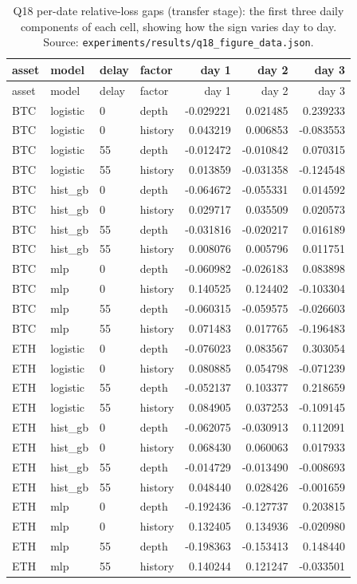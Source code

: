 \begin{longtable}{llllrrr}
\caption{Q18 per-date relative-loss gaps (transfer stage): the first three daily components of
each cell, showing how the sign varies day to day. Source:
\texttt{experiments/results/q18\_figure\_data.json}.}
\label{tab:q18daily}\\
\toprule
asset & model & delay & factor & day 1 & day 2 & day 3 \\
\midrule
\endfirsthead
\toprule
asset & model & delay & factor & day 1 & day 2 & day 3 \\
\midrule
\endhead
\bottomrule
\endfoot
BTC & logistic & 0 & depth & -0.029221 & 0.021485 & 0.239233 \\
BTC & logistic & 0 & history & 0.043219 & 0.006853 & -0.083553 \\
BTC & logistic & 55 & depth & -0.012472 & -0.010842 & 0.070315 \\
BTC & logistic & 55 & history & 0.013859 & -0.031358 & -0.124548 \\
BTC & hist\_gb & 0 & depth & -0.064672 & -0.055331 & 0.014592 \\
BTC & hist\_gb & 0 & history & 0.029717 & 0.035509 & 0.020573 \\
BTC & hist\_gb & 55 & depth & -0.031816 & -0.020217 & 0.016189 \\
BTC & hist\_gb & 55 & history & 0.008076 & 0.005796 & 0.011751 \\
BTC & mlp & 0 & depth & -0.060982 & -0.026183 & 0.083898 \\
BTC & mlp & 0 & history & 0.140525 & 0.124402 & -0.103304 \\
BTC & mlp & 55 & depth & -0.060315 & -0.059575 & -0.026603 \\
BTC & mlp & 55 & history & 0.071483 & 0.017765 & -0.196483 \\
ETH & logistic & 0 & depth & -0.076023 & 0.083567 & 0.303054 \\
ETH & logistic & 0 & history & 0.080885 & 0.054798 & -0.071239 \\
ETH & logistic & 55 & depth & -0.052137 & 0.103377 & 0.218659 \\
ETH & logistic & 55 & history & 0.084905 & 0.037253 & -0.109145 \\
ETH & hist\_gb & 0 & depth & -0.062075 & -0.030913 & 0.112091 \\
ETH & hist\_gb & 0 & history & 0.068430 & 0.060063 & 0.017933 \\
ETH & hist\_gb & 55 & depth & -0.014729 & -0.013490 & -0.008693 \\
ETH & hist\_gb & 55 & history & 0.048440 & 0.028426 & -0.001659 \\
ETH & mlp & 0 & depth & -0.192436 & -0.127737 & 0.203815 \\
ETH & mlp & 0 & history & 0.132405 & 0.134936 & -0.020980 \\
ETH & mlp & 55 & depth & -0.198363 & -0.153413 & 0.148440 \\
ETH & mlp & 55 & history & 0.140244 & 0.121247 & -0.033501 \\
\end{longtable}
